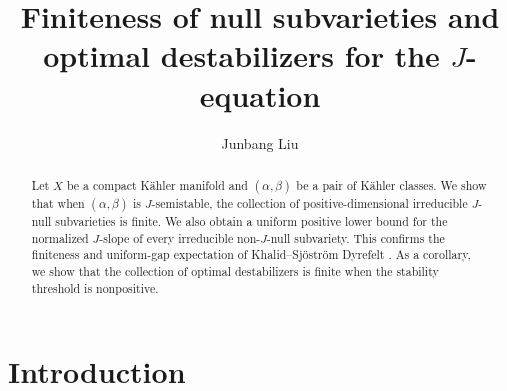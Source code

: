 \documentclass[reqno]{amsart}
\title[Finiteness for the J-equation]{Finiteness of null subvarieties and optimal destabilizers for the \(J\)-equation}
\date{}
\author{Junbang Liu}
\theoremstyle{remark}
\theoremstyle{plain}
\begin{document}
\begin{abstract}
    Let $X$ be a compact K\"ahler manifold and $(\alpha,\beta)$ be a pair of K\"ahler classes. We show that when $(\alpha,\beta)$ is $J$-semistable, the collection of positive-dimensional irreducible $J$-null subvarieties is finite. We also obtain a uniform positive lower bound for the normalized $J$-slope of every irreducible non-$J$-null subvariety. This confirms the finiteness and uniform-gap expectation of Khalid–Sjöström Dyrefelt \cite[Section 1.2, Theorem 1.5; Remark 1.8]{KSD26}.  As a corollary, we show that the collection of optimal destabilizers is finite when the stability threshold is nonpositive. 
\end{abstract}
\maketitle
\section{Introduction}
\end{document}
